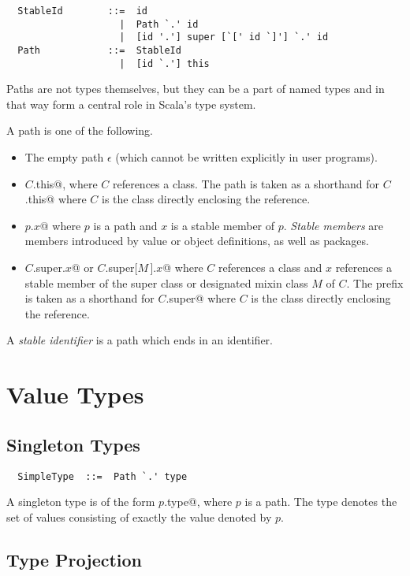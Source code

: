 \documentclass[a4paper,12pt,twoside,titlepage]{book}
\begin{document}
\syntax\begin{lstlisting}
  StableId        ::=  id
                    |  Path `.' id 
                    |  [id '.'] super [`[' id `]'] `.' id
  Path            ::=  StableId
                    |  [id `.'] this
\end{lstlisting}

Paths are not types themselves, but they can be a part of named types
and in that way form a central role in Scala's type system.

A path is one of the following.
\begin{itemize}
\item
The empty path $\epsilon$ (which cannot be written explicitly in user programs).
\item
\lstinline@$C$.this@, where $C$ references a class. 
The path  is taken as a shorthand for \lstinline@$C$.this@ where 
$C$ is the class directly enclosing the reference. 
\item
\lstinline@$p$.$x$@ where $p$ is a path and $x$ is a stable member of $p$.
{\em Stable members} are members introduced by value or object
definitions, as well as packages.
\item
\lstinline@$C$.super.$x$@ or \lstinline@$C$.super[$M\,$].$x$@
where $C$ references a class and $x$ references a 
stable member of the super class or designated mixin class $M$ of $C$. 
The prefix  is taken as a shorthand for \lstinline@$C$.super@ where 
$C$ is the class directly enclosing the reference. 
\end{itemize}
A {\em stable identifier} is a path which ends in an identifier.

\section{Value Types}

\subsection{Singleton Types}
\label{sec:singleton-type}

\syntax\begin{lstlisting}
  SimpleType  ::=  Path `.' type
\end{lstlisting}

A singleton type is of the form \lstinline@$p$.type@, where $p$ is a
path.  The type denotes the set of values consisting of
exactly the value denoted by $p$.

\subsection{Type Projection}
\label{sec:type-project}
\end{document}
